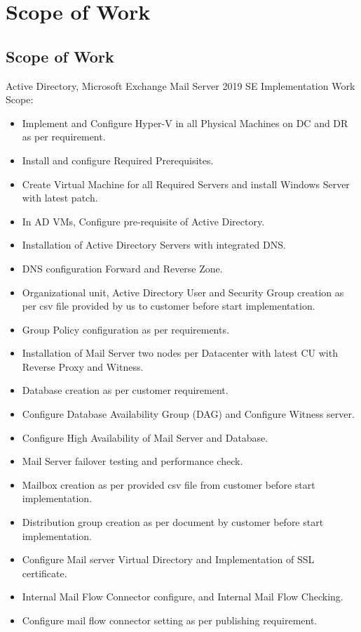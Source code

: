 \chapter{Scope of Work}
\section{Scope of Work}
Active Directory, Microsoft Exchange Mail Server 2019 SE Implementation Work Scope:
\begin{itemize}
    \item Implement and Configure Hyper-V in all Physical Machines on DC and DR as per requirement.
    \item Install and configure Required Prerequisites.
    \item Create Virtual Machine for all Required Servers and install Windows Server with latest patch.
    \item In AD VMs, Configure pre-requisite of Active Directory.
    \item Installation of Active Directory Servers with integrated DNS.
    \item DNS configuration Forward and Reverse Zone.
    \item Organizational unit, Active Directory User and Security Group creation as per csv file provided by us to customer before start implementation.
    \item Group Policy configuration as per requirements.
    \item Installation of Mail Server two nodes per Datacenter with latest CU with Reverse Proxy and Witness.
    \item Database creation as per customer requirement.
    \item Configure Database Availability Group (DAG) and Configure Witness server.
    \item Configure High Availability of Mail Server and Database.
    \item Mail Server failover testing and performance check.
    \item Mailbox creation as per provided csv file from customer before start implementation.
    \item Distribution group creation as per document by customer before start implementation.
    \item Configure Mail server Virtual Directory and Implementation of SSL certificate.
    \item Internal Mail Flow Connector configure, and Internal Mail Flow Checking.
    \item Configure mail flow connector setting as per publishing requirement.

\end{itemize}
